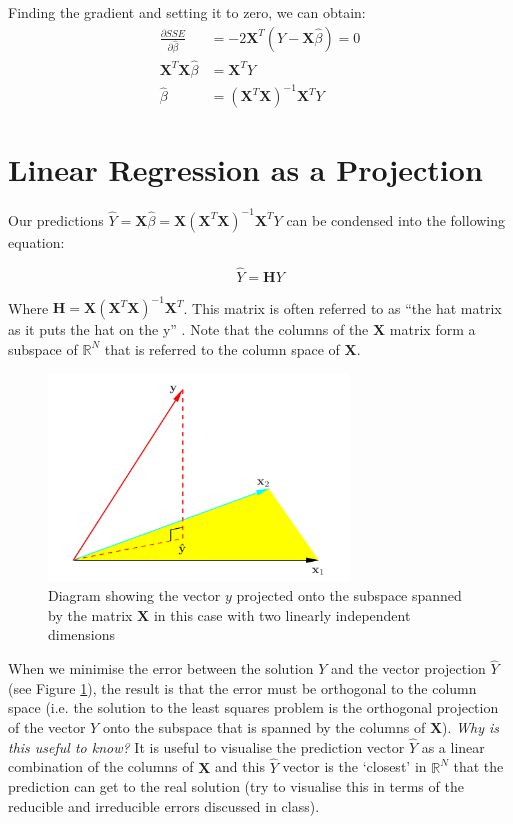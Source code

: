 \documentclass{article}
\begin{document}
Finding the gradient and setting it to zero, we can obtain:
\begin{align*}
\frac{\partial SSE}{\partial \hat{\beta}} &= -2\mathbf{X}^T(Y - \mathbf{X}\hat{\beta}) = 0\\
\mathbf{X}^T\mathbf{X}\hat{\beta} &= \mathbf{X}^TY\\
\hat{\beta} &= (\mathbf{X}^T\mathbf{X})^{-1}\mathbf{X}^TY
\end{align*}

\section{Linear Regression as a Projection}
Our predictions $\hat{Y} = \mathbf{X}\hat{\beta} = \mathbf{X}(\mathbf{X}^T\mathbf{X})^{-1}\mathbf{X}^TY$ can be condensed into the following equation:

$$
\hat{Y} = \mathbf{H}Y
$$

Where $\mathbf{H} = \mathbf{X}(\mathbf{X}^T\mathbf{X})^{-1}\mathbf{X}^T$. This matrix is often referred to as ``the hat matrix as it puts the hat on the y'' \cite{friedman2001elements}. Note that the columns of the $\mathbf{X}$ matrix form a subspace of $\mathbb{R}^N$ that is referred to the column space of $\mathbf{X}$.

\begin{figure}[h]
\center
\includegraphics[width=8cm]{l_r_projection}
\caption{Diagram showing the vector $y$ projected onto the subspace spanned by the matrix $\mathbf{X}$ in this case with two linearly independent dimensions\cite{friedman2001elements}}\label{l_r_projection}
\end{figure}

When we minimise the error between the solution $Y$ and the vector projection $\hat{Y}$ (see Figure \ref{l_r_projection}), the result is that the error must be orthogonal to the column space (i.e. the solution to the least squares problem is the orthogonal projection of the vector $Y$ onto the subspace that is spanned by the columns of $\mathbf{X}$). \textit{Why is this useful to know?} It is useful to visualise the prediction vector $\hat{Y}$ as a linear combination of the columns of $\mathbf{X}$ and this $\hat{Y}$ vector is the `closest' in $\mathbb{R}^N$ that the prediction can get to the real solution (try to visualise this in terms of the reducible and irreducible errors discussed in class).
\end{document}
